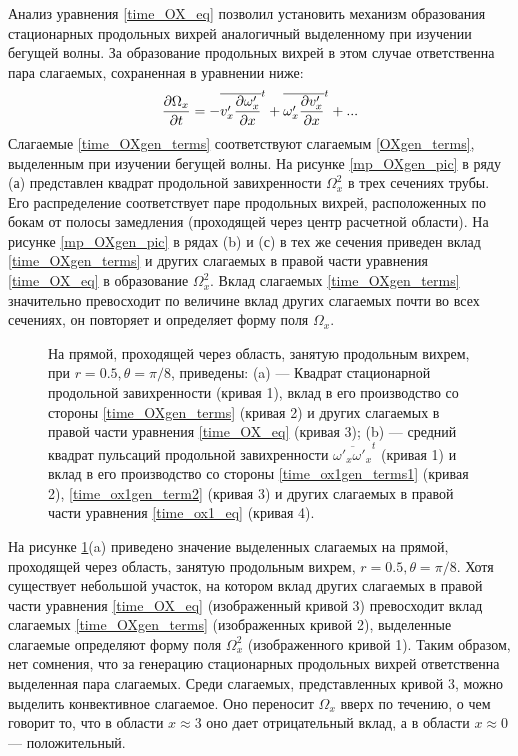 Анализ уравнения \eqref{time_OX_eq} позволил установить механизм образования стационарных продольных вихрей аналогичный выделенному при изучении бегущей волны. За образование продольных вихрей в этом случае ответственна пара слагаемых, сохраненная в уравнении ниже: 
\begin{equation} \label{time_OXgen_terms}
\frac{\partial \Omega_x}{\partial t} = - \overline{v'_x \frac{\partial \omega'_x}{\partial x}}^t + \overline{\omega'_x \frac{\partial v'_x}{\partial x}}^t + ... 
\end{equation}
Слагаемые \eqref{time_OXgen_terms} соответствуют слагаемым \eqref{OXgen_terms}, выделенным при изучении бегущей волны. На рисунке \ref{mp_OXgen_pic} в ряду (а) представлен квадрат продольной завихренности $\Omega_x^2$ в трех сечениях трубы. Его распределение соответствует паре продольных вихрей, расположенных по бокам от полосы замедления (проходящей через центр расчетной области). На рисунке \ref{mp_OXgen_pic} в рядах (b) и (с) в тех же сечения приведен вклад \eqref{time_OXgen_terms} и других слагаемых в правой части уравнения \eqref{time_OX_eq} в образование $\Omega_x^2$. Вклад слагаемых \eqref{time_OXgen_terms} значительно превосходит по величине вклад других слагаемых почти во всех сечениях, он повторяет и определяет форму поля $\Omega_x$. 

\begin{figure}
\caption{На прямой, проходящей через область, занятую продольным вихрем, при $r = 0.5, \theta = \pi/8$, приведены: (a) --- Квадрат стационарной продольной завихренности (кривая 1), вклад в его производство со стороны \eqref{time_OXgen_terms} (кривая  2) и других слагаемых в правой части уравнения \eqref{time_OX_eq} (кривая 3); (b) --- средний квадрат пульсаций продольной завихренности $\overline{\omega'_x \omega'_x}^t$ (кривая 1) и вклад в его производство со стороны \eqref{time_ox1gen_terms1} (кривая  2), \eqref{time_ox1gen_term2} (кривая  3) и других слагаемых в правой части уравнения \eqref{time_ox1_eq} (кривая  4).}
\label{xline_oxgen_pic}
\end{figure}

На рисунке \ref{xline_oxgen_pic}(a) приведено значение выделенных слагаемых на прямой, проходящей через область, занятую продольным вихрем, $r = 0.5, \theta = \pi/8$. Хотя существует небольшой участок, на котором вклад других слагаемых в правой части уравнения \eqref{time_OX_eq} (изображенный кривой 3) превосходит вклад слагаемых \eqref{time_OXgen_terms} (изображенных кривой 2), выделенные слагаемые определяют форму поля $\Omega_x^2$ (изображенного кривой 1). Таким образом, нет сомнения, что за генерацию стационарных продольных вихрей ответственна выделенная пара слагаемых. Среди слагаемых, представленных кривой 3, можно выделить конвективное слагаемое. Оно переносит $\Omega_x$ вверх по течению, о чем говорит то, что в области $x \approx 3$ оно дает отрицательный вклад, а в области $x \approx 0$ --- положительный. 

